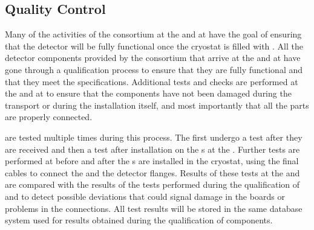 
\subsection{Quality Control}
\label{sec:fdsp-tpcelec-integration-qc}

Many of the activities of the 
consortium at the  and at  have the goal of 
ensuring that the detector will be fully functional once the cryostat
is filled with . All the detector components provided
by the  consortium that arrive at the 
and at  have gone through a qualification process to ensure
that they are fully functional and that they meet the  
specifications. Additional tests and checks are performed at the
 and at  to ensure that the components have not
been damaged during the transport or during the installation itself,
and most importantly that all the parts are properly connected.

 are tested multiple times during this process. 
The  first undergo a test after they are received and then a test after 
installation on the s at the . Further 
tests are performed at  before and after the 
s are installed in the cryostat, using the final cables to connect the  and the detector flanges. 
Results of these tests at
the  and  are compared with the results of the
tests performed during the qualification of  and
 to detect possible deviations that could signal 
damage in the boards or problems in the connections. All test 
results will be stored in the same database system used for
results obtained during the qualification of components.

